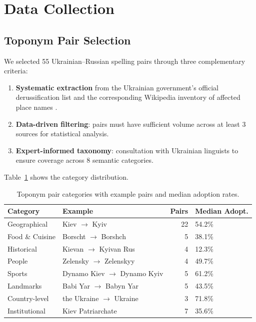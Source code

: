 \documentclass{article}
\begin{document}
\section{Data Collection}
\label{sec:data}

\subsection{Toponym Pair Selection}

We selected 55 Ukrainian--Russian spelling pairs through three complementary criteria:

\begin{enumerate}
\item \textbf{Systematic extraction} from the Ukrainian government's official derussification list and the corresponding Wikipedia inventory of affected place names \citep{wiki-derussification}.
\item \textbf{Data-driven filtering}: pairs must have sufficient volume across at least 3 sources for statistical analysis.
\item \textbf{Expert-informed taxonomy}: consultation with Ukrainian linguists to ensure coverage across 8 semantic categories.
\end{enumerate}

Table~\ref{tab:categories} shows the category distribution.

\begin{table}[t]
\centering
\small
\caption{Toponym pair categories with example pairs and median adoption rates.}
\label{tab:categories}
\begin{tabular}{llrl}
\toprule
\textbf{Category} & \textbf{Example} & \textbf{Pairs} & \textbf{Median Adopt.} \\
\midrule
Geographical & Kiev $\to$ Kyiv & 22 & 54.2\% \\
Food \& Cuisine & Borscht $\to$ Borshch & 5 & 38.1\% \\
Historical & Kievan $\to$ Kyivan Rus & 4 & 12.3\% \\
People & Zelensky $\to$ Zelenskyy & 4 & 49.7\% \\
Sports & Dynamo Kiev $\to$ Dynamo Kyiv & 5 & 61.2\% \\
Landmarks & Babi Yar $\to$ Babyn Yar & 5 & 43.5\% \\
Country-level & the Ukraine $\to$ Ukraine & 3 & 71.8\% \\
Institutional & Kiev Patriarchate & 7 & 35.6\% \\
\bottomrule
\end{tabular}
\end{table}
\end{document}
